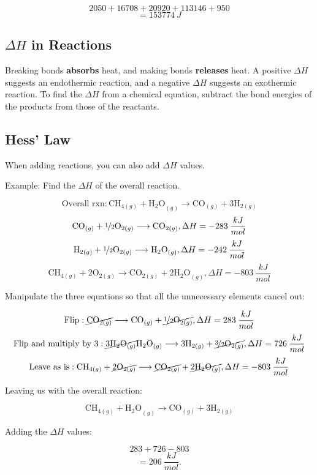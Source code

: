 \documentclass[a4paper, 12pt]{article}
\begin{document}
\[2050 + 16708 + 20920 + 113146 + 950\]
\[=\boxed{153774 \: J}\]

\subsection{$\Delta H$ in Reactions}
Breaking bonds \textbf{absorbs} heat, and making bonds \textbf{releases} heat. A positive $\Delta H$ suggests an endothermic reaction, and a negative $\Delta H$ suggests an exothermic reaction. To find the $\Delta H$ from a chemical equation, subtract the bond energies of the products from those of the reactants.

\subsection{Hess' Law}
When adding reactions, you can also add $\Delta H$ values.

Example: Find the $\Delta H$ of the overall reaction.

$$\text{Overall rxn}: \text{CH}_{4(g)} + \text{H$_2$O}_{(g)} \longrightarrow \text{CO}_{(g)} + \text{3H}_{2(g)}$$
$$\text{CO}_{(g)} + \nicefrac12 \text{O}_{2(g)} \longrightarrow \text{CO}_{2(g)}, \Delta H = -283 \: \frac{kJ}{mol}$$
$$\text{H}_{2(g)} + \nicefrac12 \text{O}_{2(g)} \longrightarrow \text{H$_2$O}_{(g)}, \Delta H = -242 \: \frac{kJ}{mol}$$
$$\text{CH}_{4(g)} + \text{2O}_{2(g)} \longrightarrow \text{CO}_{2(g)} + \text{2H$_2$O}_{(g)}, \Delta H = -803 \: \frac{kJ}{mol}$$

Manipulate the three equations so that all the unnecessary elements cancel out:

$$\text{Flip}: \cancel{\text{CO}_{2(g)}} \longrightarrow \text{CO}_{(g)} + \cancel{\nicefrac12 \text{O}_{2(g)}}, \Delta H = 283 \: \frac{kJ}{mol}$$
$$\text{Flip and multiply by 3}: \cancel{\text{3H$_2$O}_{(g)}} \text{H$_2$O}_{(g)} \longrightarrow \text{3H}_{2(g)} + \cancel{\nicefrac32 \text{O}_{2(g)}}, \Delta H = 726 \: \frac{kJ}{mol}$$
$$\text{Leave as is}: \text{CH}_{4(g)} + \cancel{\text{2O}_{2(g)}} \longrightarrow \cancel{\text{CO}_{2(g)}} + \cancel{\text{2H$_2$O}_{(g)}}, \Delta H = -803 \: \frac{kJ}{mol}$$

Leaving us with the overall reaction:

$$\text{CH}_{4(g)} + \text{H$_2$O}_{(g)} \longrightarrow \text{CO}_{(g)} + \text{3H}_{2(g)}$$

Adding the $\Delta H$ values:

$$283 + 726 - 803$$
$$ = \boxed{206 \: \frac{kJ}{mol}.}$$
\end{document}
